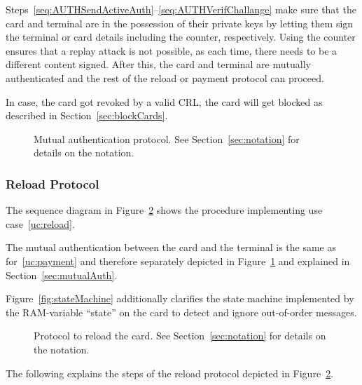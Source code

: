 \documentclass{article}
\begin{document}
Steps~\ref{seq:AUTHSendActiveAuth}--\ref{seq:AUTHVerifChallange} make sure that the card and terminal are in the possession of their private keys by letting them sign the terminal or card details including the counter, respectively.
Using the counter ensures that a replay attack is not possible, as each time, there needs to be a different content signed.
After this, the card and terminal are mutually authenticated and the rest of the reload or payment protocol can proceed.

In case, the card got revoked by a valid CRL, the card will get blocked as described in Section~\ref{sec:blockCards}.

\begin{figure}
    \centering
    
    \caption{Mutual authentication protocol.
    See Section~\ref{sec:notation} for details on the notation.
    }
    \label{fig:MutualAuth}
\end{figure}

\subsubsection{Reload Protocol}
The sequence diagram in Figure~\ref{fig:ReloadProtocol} shows the procedure implementing use case~\ref{uc:reload}.

The mutual authentication between the card and the terminal is the same as for~\ref{uc:payment} and therefore separately depicted in Figure~\ref{fig:MutualAuth} and explained in Section~\ref{sec:mutualAuth}.

Figure~\ref{fig:stateMachine} additionally clarifies the state machine implemented by the  RAM-variable ``state'' on the card to detect and ignore out-of-order messages.

\begin{figure}
    \centering
    
    \caption{Protocol to reload the card.
    See Section~\ref{sec:notation} for details on the notation.
    }
    \label{fig:ReloadProtocol}
\end{figure}

The following explains the steps of the reload protocol depicted in Figure~\ref{fig:ReloadProtocol}.
\end{document}
